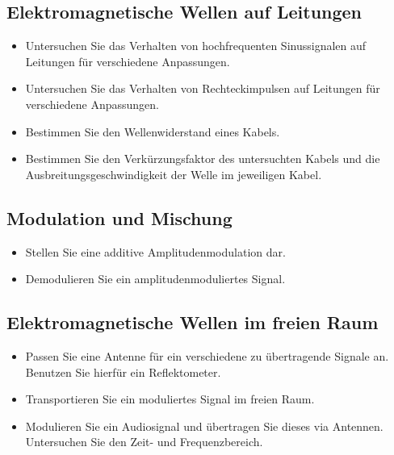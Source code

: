 \subsection{Elektromagnetische Wellen auf Leitungen} %
\label{sub:elektromagnetische_wellen_auf_leitungen}

	\begin{itemize}
		\item
			Untersuchen Sie das Verhalten von hochfrequenten Sinussignalen auf Leitungen für verschiedene Anpassungen.
		\item
			Untersuchen Sie das Verhalten von Rechteckimpulsen auf Leitungen für verschiedene Anpassungen.
		\item
			Bestimmen Sie den Wellenwiderstand eines Kabels.
		\item
			Bestimmen Sie den Verkürzungsfaktor des untersuchten Kabels und die Ausbreitungsgeschwindigkeit der Welle im jeweiligen Kabel.
	\end{itemize}


\subsection{Modulation und Mischung} %
\label{sub:modulation_und_mischung}

	\begin{itemize}
		\item
			Stellen Sie eine additive Amplitudenmodulation dar.
		\item
			Demodulieren Sie ein amplitudenmoduliertes Signal.
	\end{itemize}


\subsection{Elektromagnetische Wellen im freien Raum} %
\label{sub:elektromagnetische_wellen_im_freien_raum}

	\begin{itemize}
		\item
			Passen Sie eine Antenne für ein verschiedene zu übertragende Signale an. Benutzen Sie hierfür ein Reflektometer.
		\item
			Transportieren Sie ein moduliertes Signal im freien Raum.
		\item
			Modulieren Sie ein Audiosignal und übertragen Sie dieses via Antennen. Untersuchen Sie den Zeit- und Frequenzbereich. 
	\end{itemize}

